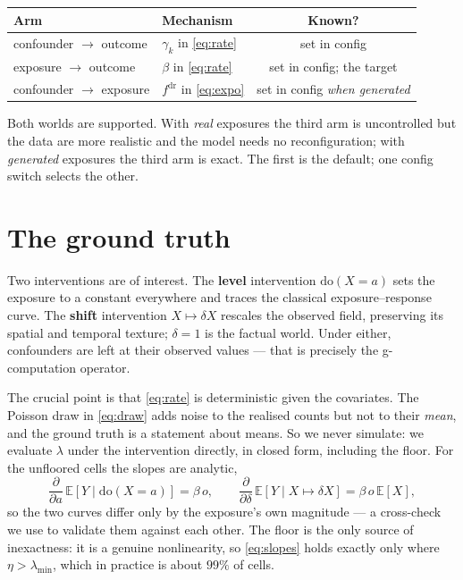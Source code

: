 \documentclass[11pt]{article}
\newcommand{\Exp}{\mathbb{E}}
\begin{document}
\begin{center}
\begin{tabular}{llc}
\toprule
Arm & Mechanism & Known? \\
\midrule
confounder $\to$ outcome  & $\gamma_k$ in \eqref{eq:rate}         & set in config \\
exposure $\to$ outcome    & $\beta$ in \eqref{eq:rate}            & set in config; the target \\
confounder $\to$ exposure & $f^{\mathrm{dr}}$ in \eqref{eq:expo}  & set in config \emph{when generated} \\
\bottomrule
\end{tabular}
\end{center}

Both worlds are supported. With \emph{real} exposures the third arm is uncontrolled but the data
are more realistic and the model needs no reconfiguration; with \emph{generated} exposures the
third arm is exact. The first is the default; one config switch selects the other.

\section{The ground truth}\label{sec:truth}

Two interventions are of interest. The \textbf{level} intervention $\mathrm{do}(X = a)$ sets the
exposure to a constant everywhere and traces the classical exposure--response curve. The
\textbf{shift} intervention $X \mapsto \delta X$ rescales the observed field, preserving its
spatial and temporal texture; $\delta = 1$ is the factual world. Under either, confounders are
left at their observed values --- that is precisely the g-computation operator.

The crucial point is that \eqref{eq:rate} is deterministic given the covariates. The Poisson draw
in \eqref{eq:draw} adds noise to the realised counts but not to their \emph{mean}, and the ground
truth is a statement about means. So we never simulate: we evaluate $\lambda$ under the
intervention directly, in closed form, including the floor. For the unfloored cells the slopes are
analytic,
\begin{equation}\label{eq:slopes}
  \frac{\partial}{\partial a}\,\Exp[Y \mid \mathrm{do}(X=a)] = \beta\, o,
  \qquad
  \frac{\partial}{\partial \delta}\,\Exp[Y \mid X \mapsto \delta X] = \beta\, o\, \Exp[X],
\end{equation}
so the two curves differ only by the exposure's own magnitude --- a cross-check we use to validate
them against each other. The floor is the only source of inexactness: it is a genuine
nonlinearity, so \eqref{eq:slopes} holds exactly only where $\eta > \lambda_{\min}$, which in
practice is about $99\%$ of cells.
\end{document}
